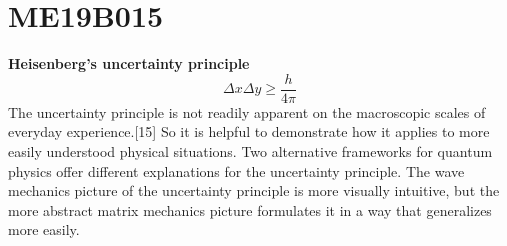 \section{ME19B015}
\textbf{Heisenberg's uncertainty principle}
\begin{equation}
{\Delta x \Delta y}\geq\frac{h}{4\pi} 
\end{equation}
The uncertainty principle is not readily apparent on the macroscopic scales of everyday experience.[15] So it is helpful to demonstrate how it applies to more easily understood physical situations. Two alternative frameworks for quantum physics offer different explanations for the uncertainty principle. The wave mechanics picture of the uncertainty principle is more visually intuitive, but the more abstract matrix mechanics picture formulates it in a way that generalizes more easily.
